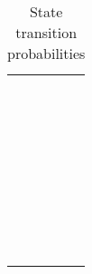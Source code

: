 \documentclass{acm_proc_article-sp}
\begin{document}
\begin{table}[htbp]
\scriptsize
\centering
\begin{tabular}{lll}\hline
         &        &\\
                &             &\\
                &             &\\
                &             &\\
                &             &\\
                &             &\\
         &        &\\
                &             &\\
                &             &\\
                &             &\\
                &             &\\
                &             &\\
                &             &\\
         &        &\\
                &             &\\
                &             &\\
                &             &\\
         &        &\\
                &             &\\
                &             &\\
                &             &\\
         &        &\\
                &             &\\
                &             &\\
                &             &\\
                &             &\\
                &             &\\
                &             &\\
         &        &\\
                &             &\\
                &             &\\
                &             &\\
                &             &\\
                &             &\\
                &             &\\
\hline
\end{tabular}
\caption{\label{statetransition} State transition probabilities}
\end{table}
\\
\end{document}
